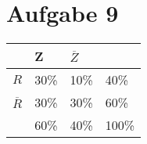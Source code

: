 \documentclass[12pt,a4paper]{report}
\begin{document}
	\section{Aufgabe 9}

	\begin{tabularx}{0.74\textwidth}{|X|X|X|X|}
		\hline
		& Z & $\overline{Z}$ & \\
		\hline
		$R$ & 30\%& 10\%& 40\% \\
		\hline
		$\overline{R}$ & 30\%&30\%& 60\% \\
		\hline
		&60\%&40\%& 100\% \\
		\hline
	\end{tabularx}
\end{document}
